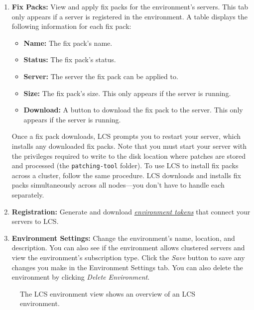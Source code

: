 \begin{enumerate}
\def\labelenumi{\arabic{enumi}.}
\item
  \textbf{Fix Packs:} View and apply fix packs for the environment's
  servers. This tab only appears if a server is registered in the
  environment. A table displays the following information for each fix
  pack:

  \begin{itemize}
  \tightlist
  \item
    \textbf{Name:} The fix pack's name.
  \item
    \textbf{Status:} The fix pack's status.
  \item
    \textbf{Server:} The server the fix pack can be applied to.
  \item
    \textbf{Size:} The fix pack's size. This only appears if the server
    is running.
  \item
    \textbf{Download:} A button to download the fix pack to the server.
    This only appears if the server is running.
  \end{itemize}

  Once a fix pack downloads, LCS prompts you to restart your server,
  which installs any downloaded fix packs. Note that you must start your
  server with the privileges required to write to the disk location
  where patches are stored and processed (the \texttt{patching-tool}
  folder). To use LCS to install fix packs across a cluster, follow the
  same procedure. LCS downloads and installs fix packs simultaneously
  across all nodes---you don't have to handle each separately.
\item
  \textbf{Registration:} Generate and download
  \href{/docs/7-2/deploy/-/knowledge_base/d/understanding-environment-tokens}{\emph{environment
  tokens}} that connect your servers to LCS.
\item
  \textbf{Environment Settings:} Change the environment's name,
  location, and description. You can also see if the environment allows
  clustered servers and view the environment's subscription type. Click
  the \emph{Save} button to save any changes you make in the Environment
  Settings tab. You can also delete the environment by clicking
  \emph{Delete Environment}.
\end{enumerate}

\begin{figure}
\centering
{}
\caption{The LCS environment view shows an overview of an LCS
environment.}
\end{figure}

